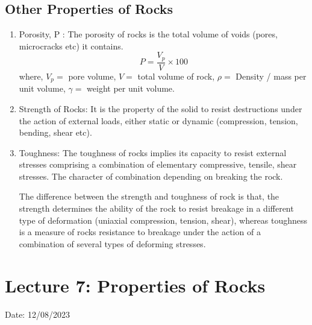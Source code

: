 \documentclass{article}
\begin{document}
\begin{multicols}{2}
  \subsection*{Other Properties of Rocks}
  \begin{enumerate}
    \item Porosity, P : The porosity of rocks is the total volume of voids (pores, microcracks etc) it contains. 
    $$P = \frac{V_p}{V} \times 100$$
    where, $V_p = $ pore volume, $V = $ total volume of rock, $\rho = $ Density / mass per unit volume, $\gamma = $ weight per unit volume. 
    \item Strength of Rocks: It is the property of the solid to resist destructions under the action of external loads, either static or dynamic (compression, tension, bending, shear etc).
    \item Toughness: The toughness of rocks implies its capacity to resist external stresses comprising a combination of elementary compressive, tensile, shear stresses. The character of combination depending on breaking the rock. 
    
    The difference between the strength and toughness of rock is that, the strength determines the ability of the rock to resist breakage in a different type of deformation (uniaxial compression, tension, shear), whereas toughness is a measure of rocks resistance to breakage under the action of a combination of several types of deforming stresses.
  \end{enumerate}
  
\end{multicols}

\section{Lecture 7: Properties of Rocks}
\hfill Date: 12/08/2023
\end{document}
